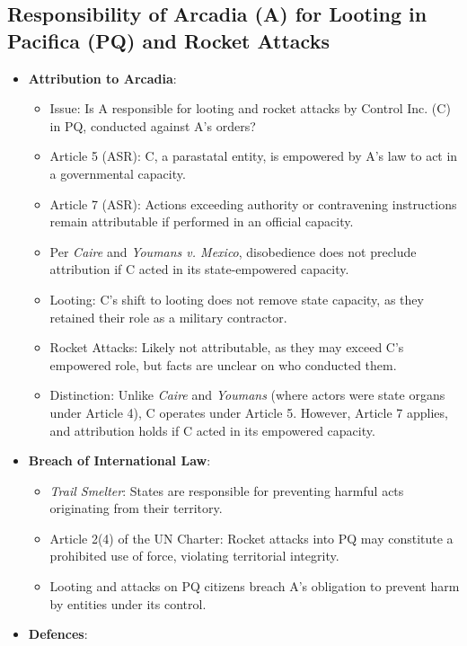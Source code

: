 \subsection{Responsibility of Arcadia (A) for Looting in Pacifica (PQ) and Rocket Attacks}
\begin{itemize}
    \item \textbf{Attribution to Arcadia}:
    \begin{itemize}
        \item Issue: Is A responsible for looting and rocket attacks by Control Inc. (C) in PQ, conducted against A’s orders?
        \item Article 5 (ASR): C, a parastatal entity, is empowered by A’s law to act in a governmental capacity.
        \item Article 7 (ASR): Actions exceeding authority or contravening instructions remain attributable if performed in an official capacity.
        \item Per \textit{Caire} and \textit{Youmans v. Mexico}, disobedience does not preclude attribution if C acted in its state-empowered capacity.
        \item Looting: C’s shift to looting does not remove state capacity, as they retained their role as a military contractor.
        \item Rocket Attacks: Likely not attributable, as they may exceed C’s empowered role, but facts are unclear on who conducted them.
        \item Distinction: Unlike \textit{Caire} and \textit{Youmans} (where actors were state organs under Article 4), C operates under Article 5. However, Article 7 applies, and attribution holds if C acted in its empowered capacity.
    \end{itemize}
    \item \textbf{Breach of International Law}:
    \begin{itemize}
        \item \textit{Trail Smelter}: States are responsible for preventing harmful acts originating from their territory.
        \item Article 2(4) of the UN Charter: Rocket attacks into PQ may constitute a prohibited use of force, violating territorial integrity.
        \item Looting and attacks on PQ citizens breach A’s obligation to prevent harm by entities under its control.
    \end{itemize}
    \item \textbf{Defences}:

\end{itemize}
